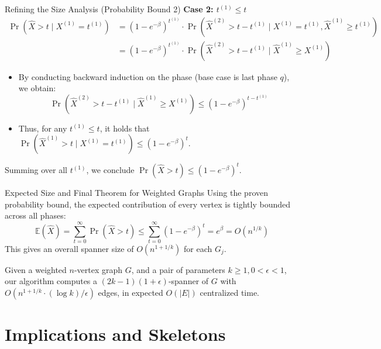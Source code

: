 \documentclass{beamer}
\begin{document}
\begin{frame}{Refining the Size Analysis (Probability Bound 2)}
    \textbf{Case 2: $t^{(1)} \le t$}
    \small
    \begin{align*}
        \Pr(\hat{X} > t \mid X^{(1)} = t^{(1)}) &= (1 - e^{-\beta})^{t^{(1)}} \cdot \Pr(\hat{X}^{(2)} > t - t^{(1)} \mid X^{(1)} = t^{(1)}, \hat{X}^{(1)} \ge t^{(1)}) \\
        &= (1 - e^{-\beta})^{t^{(1)}} \cdot \Pr(\hat{X}^{(2)} > t - t^{(1)} \mid \hat{X}^{(1)} \ge X^{(1)})
    \end{align*}
    
    \begin{itemize}
        \item By conducting backward induction on the phase (base case is last phase $q$), we obtain:
        \[ \Pr(\hat{X}^{(2)} > t - t^{(1)} \mid \hat{X}^{(1)} \ge X^{(1)}) \le (1 - e^{-\beta})^{t - t^{(1)}} \]
        \item Thus, for any $t^{(1)} \le t$, it holds that $\Pr(\hat{X}^{(1)} > t \mid X^{(1)} = t^{(1)}) \le (1 - e^{-\beta})^t$.
    \end{itemize}
    
    \vspace{0.1cm}
    Summing over all $t^{(1)}$, we conclude $\Pr(\hat{X} > t) \le (1 - e^{-\beta})^t$.
\end{frame}

\begin{frame}{Expected Size and Final Theorem for Weighted Graphs}
    Using the proven probability bound, the expected contribution of every vertex is tightly bounded across all phases:
    \[ \mathbb{E}(\hat{X}) = \sum_{t=0}^\infty \Pr(\hat{X} > t) \le \sum_{t=0}^\infty (1 - e^{-\beta})^t = e^\beta = O(n^{1/k}) \]
    This gives an overall spanner size of $O(n^{1+1/k})$ for each $G_j$.
    
    \vspace{0.4cm}
    \begin{theorem}[Theorem 2]
        Given a weighted $n$-vertex graph $G$, and a pair of parameters $k \ge 1, 0 < \epsilon < 1$, our algorithm computes a $(2k - 1)(1 + \epsilon)$-spanner of $G$ with $O(n^{1+1/k} \cdot (\log k)/\epsilon)$ edges, in expected $O(|E|)$ centralized time.
    \end{theorem}
\end{frame}

\section{Implications and Skeletons}
\end{document}
